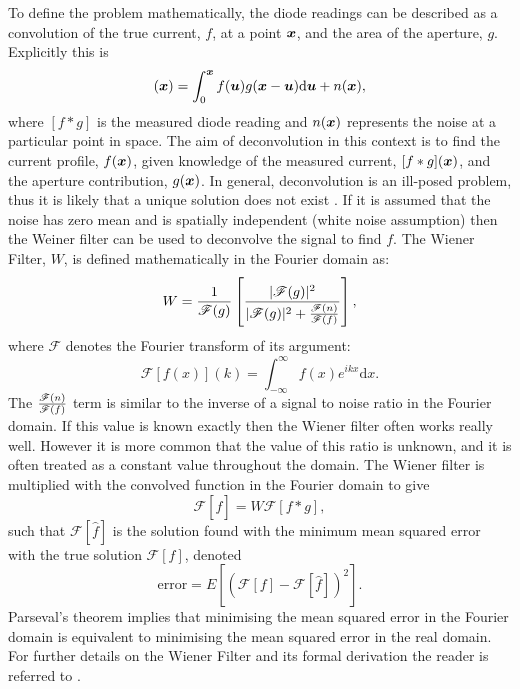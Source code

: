 To define the problem mathematically, the diode readings can be described as a convolution of the true current, $f$, at a point $\boldsymbol{x}$, and the area of the aperture, $g$.
Explicitly this is
\begin{equation}
[f*g](\bs{x}) = \int_0^{\bs{x}} f(\bs{u})g(\bs{x}-\bs{u})\mathrm{d}\bs{u} + n(\bs{x}),
\label{eq:Convolution equation with noise}
\end{equation}
where $[f*g]$ is the measured diode reading and $n(\boldsymbol{x})$ represents the noise at a particular point in space.
The aim of deconvolution in this context is to find the current profile, $f(\boldsymbol{x})$, given knowledge of the measured current, $[f*g](\boldsymbol{x})$, and the aperture contribution, $g(\boldsymbol{x})$.
In general, deconvolution is an ill-posed problem, thus it is likely that a unique solution does not exist \cite{wolfram2016Deconvolution}.
If it is assumed that the noise has zero mean and is spatially independent (white noise assumption) then the Weiner filter can be used to deconvolve the signal to find $f$.
The Wiener Filter, $W$, is defined mathematically in the Fourier domain as:
\begin{equation}
W = \frac{1}{\mathscr{F}(g)}\left[\frac{|\mathscr{F}(g)|^2}{|\mathscr{F}(g)|^2 + \frac{\mathscr{F}(n)}{\mathscr{F}(f)}}\right],
\label{eq:Weiner Filter}
\end{equation}
where $\mathscr{F}$ denotes the Fourier transform of its argument:
\begin{equation}
\mathscr{F}[f(x)](k) = \int_{-\infty}^{\infty} \! f(x) e^{ikx} \mathrm{d}x.
\label{eq:Classic Fourier Transform}
\end{equation}
The $\frac{\mathscr{F}(n)}{\mathscr{F}(f)}$ term is similar to the inverse of a signal to noise ratio in the Fourier domain.
If this value is known exactly then the Wiener filter often works really well.
However it is more common that the value of this ratio is unknown, and it is often treated as a constant value throughout the domain.
\newline
The Wiener filter is multiplied with the convolved function in the Fourier domain to give
\begin{equation}
\mathscr{F}[\widehat{f}] = W \mathscr{F}[f*g],
\label{eqwienapp}
\end{equation}
such that $\mathscr{F}[\widehat{f}]$ is the solution found with the minimum mean squared error with the true solution $\mathscr{F}[f]$, denoted
\begin{equation}
\text{error} = E\left[ \left(\mathscr{F}[f]-\mathscr{F}[\widehat{f}]\right)^2\right].
\label{eqerr}
\end{equation}
Parseval's theorem implies that minimising the mean squared error in the Fourier domain is equivalent to minimising the mean squared error in the real domain. For further details on the Wiener Filter and its formal derivation the reader is referred to \cite{gon1992}.

